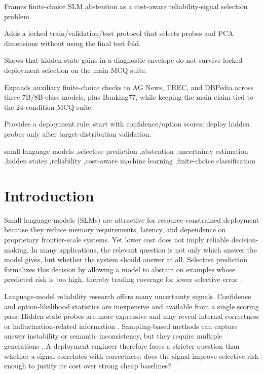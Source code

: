 \documentclass[preprint,12pt,authoryear]{elsarticle}
\begin{document}
\begin{frontmatter}
\begin{highlights}
\item Frames finite-choice SLM abstention as a cost-aware reliability-signal selection problem.
\item Adds a locked train/validation/test protocol that selects probes and PCA dimensions without using the final test fold.
\item Shows that hidden-state gains in a diagnostic envelope do not survive locked deployment selection on the main MCQ suite.
\item Expands auxiliary finite-choice checks to AG News, TREC, and DBPedia across three 7B/8B-class models, plus Banking77, while keeping the main claim tied to the 24-condition MCQ suite.
\item Provides a deployment rule: start with confidence/option scores; deploy hidden probes only after target-distribution validation.
\end{highlights}

\begin{keyword}
small language models \sep selective prediction \sep abstention \sep uncertainty estimation \sep hidden states \sep reliability \sep cost-aware machine learning \sep finite-choice classification
\end{keyword}

\end{frontmatter}

\section{Introduction}
Small language models (SLMs) are attractive for resource-constrained deployment because they reduce memory requirements, latency, and dependence on proprietary frontier-scale systems. Yet lower cost does not imply reliable decision-making. In many applications, the relevant question is not only which answer the model gives, but whether the system should answer at all. Selective prediction formalizes this decision by allowing a model to abstain on examples whose predicted risk is too high, thereby trading coverage for lower selective error \citep{geifman2017selective,geifman2019selectivenet}.

Language-model reliability research offers many uncertainty signals. Confidence and option-likelihood statistics are inexpensive and available from a single scoring pass. Hidden-state probes are more expressive and may reveal internal correctness or hallucination-related information \citep{chen2024inside,orgad2024llms}. Sampling-based methods can capture answer instability or semantic inconsistency, but they require multiple generations \citep{manakul2023selfcheckgpt,farquhar2024semanticentropy}. A deployment engineer therefore faces a stricter question than whether a signal correlates with correctness: does the signal improve selective risk enough to justify its cost over strong cheap baselines?
\end{document}

